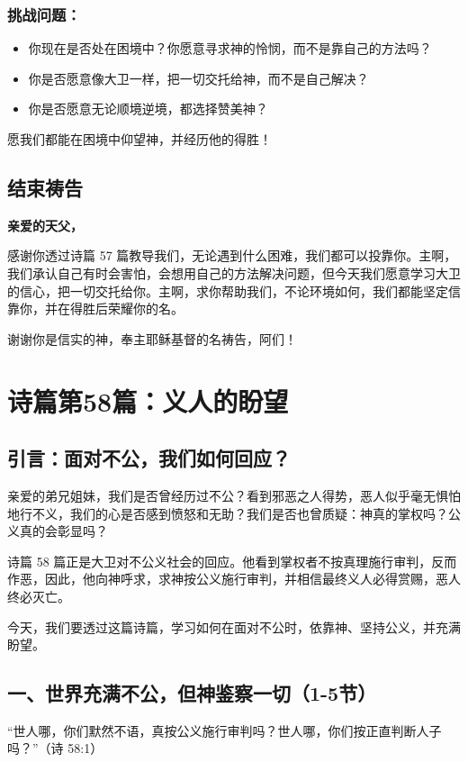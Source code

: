\documentclass[a4paper, 12pt]{article}
\begin{document}
\subsubsection*{挑战问题：}
\begin{itemize}
    \item 你现在是否处在困境中？你愿意寻求神的怜悯，而不是靠自己的方法吗？

    \item 你是否愿意像大卫一样，把一切交托给神，而不是自己解决？

    \item 你是否愿意无论顺境逆境，都选择赞美神？

\end{itemize}

愿我们都能在困境中仰望神，并经历他的得胜！

\subsection*{结束祷告}
\textbf{亲爱的天父，}

感谢你透过诗篇 57 篇教导我们，无论遇到什么困难，我们都可以投靠你。主啊，我们承认自己有时会害怕，会想用自己的方法解决问题，但今天我们愿意学习大卫的信心，把一切交托给你。主啊，求你帮助我们，不论环境如何，我们都能坚定信靠你，并在得胜后荣耀你的名。

谢谢你是信实的神，奉主耶稣基督的名祷告，阿们！
\newpage
\section{诗篇第58篇：义人的盼望}
\subsection*{引言：面对不公，我们如何回应？}
\hspace{0.6cm}亲爱的弟兄姐妹，我们是否曾经历过不公？看到邪恶之人得势，恶人似乎毫无惧怕地行不义，我们的心是否感到愤怒和无助？我们是否也曾质疑：神真的掌权吗？公义真的会彰显吗？

诗篇 58 篇正是大卫对不公义社会的回应。他看到掌权者不按真理施行审判，反而作恶，因此，他向神呼求，求神按公义施行审判，并相信最终义人必得赏赐，恶人终必灭亡。

今天，我们要透过这篇诗篇，学习如何在面对不公时，依靠神、坚持公义，并充满盼望。

\subsection*{一、世界充满不公，但神鉴察一切（1-5节）}
“世人哪，你们默然不语，真按公义施行审判吗？世人哪，你们按正直判断人子吗？”（诗 58:1）
\end{document}
